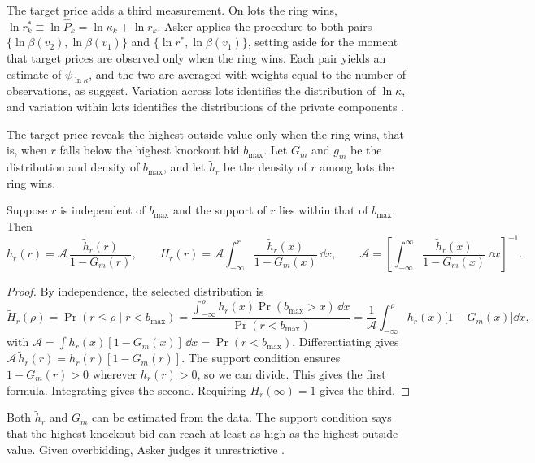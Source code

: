 The target price adds a third measurement. On lots the ring wins, $\ln r_k^*\equiv\ln\hat P_k=\ln\kappa_k+\ln r_k$.
Asker applies the procedure to both pairs $\{\ln\beta(v_2),\ln\beta(v_1)\}$ and $\{\ln r^*,\ln\beta(v_1)\}$, setting
aside for the moment that target prices are observed only when the ring wins. Each pair yields an estimate of
$\psi_{\ln\kappa}$, and the two are averaged with weights equal to the number of observations, as
\citet{LiVuong1998} suggest. Variation across lots identifies the distribution of $\ln\kappa$, and variation within
lots identifies the distributions of the private components \citep[pp.~745--746]{Asker2010}.

The target price reveals the highest outside value only when the ring wins, that is, when $r$ falls below the
highest knockout bid $b_{\max}$. Let $G_m$ and $g_m$ be the distribution and density of $b_{\max}$, and let
$\tilde h_r$ be the density of $r$ among lots the ring wins.

\begin{proposition}\label{prop:13-asker-selection}
Suppose $r$ is independent of $b_{\max}$ and the support of $r$ lies within that of $b_{\max}$. Then
\begin{equation}\label{eq:13-asker-selection}
h_r(r)=\mathcal{A}\,\frac{\tilde h_r(r)}{1-G_m(r)},\qquad
H_r(r)=\mathcal{A}\int_{-\infty}^{r}\frac{\tilde h_r(x)}{1-G_m(x)}\,\dd x,\qquad
\mathcal{A}=\left[\int_{-\infty}^{\infty}\frac{\tilde h_r(x)}{1-G_m(x)}\,\dd x\right]^{-1}.
\end{equation}
\end{proposition}

\begin{proof}
By independence, the selected distribution is
\[
\tilde H_r(\rho)=\Pr(r\le\rho\mid r<b_{\max})=\frac{\int_{-\infty}^{\rho}h_r(x)\Pr(b_{\max}>x)\,\dd x}{\Pr(r<b_{\max})}
=\frac{1}{\mathcal{A}}\int_{-\infty}^{\rho}h_r(x)\bigl[1-G_m(x)\bigr]\dd x ,
\]
with $\mathcal{A}=\int h_r(x)[1-G_m(x)]\,\dd x=\Pr(r<b_{\max})$. Differentiating gives
$\mathcal{A}\,\tilde h_r(r)=h_r(r)[1-G_m(r)]$. The support condition ensures $1-G_m(r)>0$ wherever $h_r(r)>0$, so we
can divide. This gives the first formula. Integrating gives the second. Requiring $H_r(\infty)=1$ gives the third.
\end{proof}

Both $\tilde h_r$ and $G_m$ can be estimated from the data. The support condition says that the highest knockout
bid can reach at least as high as the highest outside value. Given overbidding, Asker judges it unrestrictive
\citep[p.~747]{Asker2010}.

